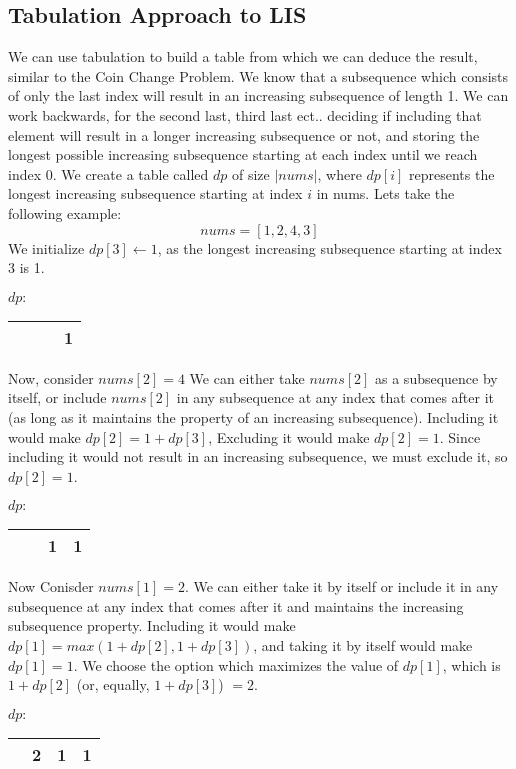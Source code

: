 \subsection{Tabulation Approach to LIS}
We can use tabulation to build a table from which we can deduce the result, similar to the Coin Change Problem.
We know that a subsequence which consists of only the last index will result in an increasing subsequence of length 1.
We can work backwards, for the second last, third last ect.. deciding if including that element will result in a longer increasing subsequence or not,
and storing the longest possible increasing subsequence starting at each index until we reach index 0.
We create a table called $dp$ of size $|nums|$, where $dp[i]$ represents the longest increasing subsequence starting at index $i$ in nums.
Lets take the following example:$$nums = [1,2,4,3]$$
We initialize $dp[3] \leftarrow 1$, as the longest increasing subsequence starting at index 3 is 1.
\begin{table}[H]
    \centering
    $dp:$
    \begin{tabular}{|c|c|c|c|}
        \hline
        \phantom{0} & \phantom{0} & \phantom{0} & 1 \\
        \hline
    \end{tabular}
\end{table}
Now, consider $nums[2] = 4$
We can either take $nums[2]$ as a subsequence by itself, or include $nums[2]$ in any subsequence at any index that comes after it (as long as it maintains the property of an increasing subsequence).
Including it would make $dp[2] = 1+dp[3]$,
Excluding it would make $dp[2] = 1$.
Since including it would not result in an increasing subsequence, we must exclude it, so $dp[2] = 1$.
\begin{table}[H]
    \centering
    $dp:$
    \begin{tabular}{|c|c|c|c|}
        \hline
        \phantom{0} & \phantom{0} & 1 & 1 \\
        \hline
    \end{tabular}
\end{table}
Now Conisder $nums[1] = 2$.
We can either take it by itself or include it in any subsequence at any index that comes after it and maintains the increasing subsequence property.
Including it would make $dp[1] = max(1+dp[2], 1+dp[3])$, and taking it by itself would make $dp[1] = 1$.
We choose the option which maximizes the value of $dp[1]$, which is $1+dp[2]$ (or, equally, $1+dp[3]$) $= 2$.
\begin{table}[H]
    \centering
    $dp:$
    \begin{tabular}{|c|c|c|c|}
        \hline
        \phantom{0} & 2 & 1 & 1 \\
        \hline
    \end{tabular}
\end{table}
